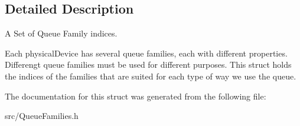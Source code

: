 \subsection{Detailed Description}
A Set of Queue Family indices. 

Each physical\+Device has several queue families, each with different properties. Differengt queue families must be used for different purposes. This struct holds the indices of the families that are suited for each type of way we use the queue. 

The documentation for this struct was generated from the following file\+:\begin{DoxyCompactItemize}
\item 
src/Queue\+Families.\+h\end{DoxyCompactItemize}
